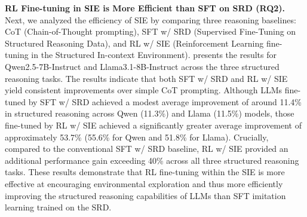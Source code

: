 \documentclass{article} %
\begin{document}
\textbf{RL Fine-tuning in SIE is More Efficient than SFT on SRD (RQ2).} 
Next, we analyzed the efficiency of SIE by comparing three reasoning baselines: CoT (Chain-of-Thought prompting), SFT w/ SRD (Supervised Fine-Tuning on Structured Reasoning Data), and RL w/ SIE (Reinforcement Learning fine-tuning in the Structured In-context Environment). 
 presents the results for Qwen2.5-7B-Instruct and Llama3.1-8B-Instruct across the three structured reasoning tasks. The results indicate that both SFT w/ SRD and RL w/ SIE yield consistent improvements over simple CoT prompting. 
Although LLMs fine-tuned by SFT w/ SRD achieved a modest average improvement of around 11.4\% in structured reasoning across Qwen (11.3\%) and Llama (11.5\%) models, those fine-tuned by RL w/ SIE achieved a significantly greater average improvement of approximately 53.7\% (55.6\% for Qwen and 51.8\% for Llama).
Crucially, compared to the conventional SFT w/ SRD baseline, RL w/ SIE provided an additional performance gain exceeding 40\% across all three structured reasoning tasks. 
These results demonstrate that RL fine-tuning within the SIE is more effective at encouraging environmental exploration and thus more efficiently improving the structured reasoning capabilities of LLMs than SFT imitation learning trained on the SRD. 

\begin{table}[!t]
\centering
\vspace{-5pt}
\caption{Structured reasoning evaluation results under different fine-tuning methods. The red numbers in parentheses indicate the performance gains of SFT w/ SRD and RL w/ SIE relative to CoT. RL fine-tuning in SIE significantly outperforms SFT on SRD, demonstrating the \textbf{efficiency} of SIE.}
\vspace{-10pt}
\label{tab:performance_comparison}
\vspace{-10pt}
\end{table}
\end{document}
